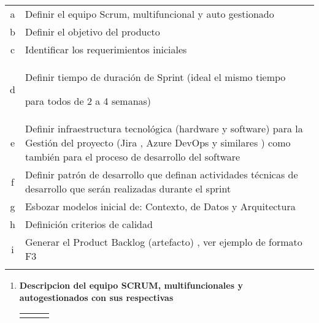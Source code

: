 \begin{doublespace}
\begin{longtable}{|c|p{15cm}|}
    a & Definir el equipo Scrum, multifuncional y auto gestionado \\
    \rowcolor{lightblue} b & Definir el objetivo del producto\\
    \hline
    c & Identificar los requerimientos iniciales \\
    \hline
    \rowcolor{lightblue} d & Definir tiempo de duración de Sprint (ideal el mismo tiempo\par
        para todos de 2 a 4 semanas)\\
    \hline
    e & Definir infraestructura tecnológica (hardware y software)
     para la Gestión del proyecto (Jira , Azure DevOps y similares ) como también para el proceso de
    desarrollo del software\\
    \hline
    \rowcolor{lightblue} f & Definir patrón de desarrollo que definan actividades técnicas de desarrollo que
    serán realizadas durante el sprint \\
    \hline
    g & Esbozar modelos inicial de: Contexto, de Datos y Arquitectura\\
    \hline
    \rowcolor{lightblue} h & Definición criterios de calidad\\
    \hline
    i & Generar el Product Backlog (artefacto) , ver ejemplo de formato F3\\
    \hline
    \rowcolor{bleudefrance} \multicolumn{2}{c|}{} \\
    \hline
    
    \end{longtable}

\clearpage  %
\begin{enumerate}[label=\alph*)]
    \item \textbf{Descripcion del equipo SCRUM, multifuncionales y autogestionados con sus respectivas}
    
   
       
   
       \renewcommand{\arraystretch}{1.1} %
   
       \begin{longtable}{|p{4cm}|p{5cm}|p{6cm}|}
       \hline
       \rowcolor{bleudefrance}
   

\end{longtable}
\end{enumerate}
\end{doublespace}
